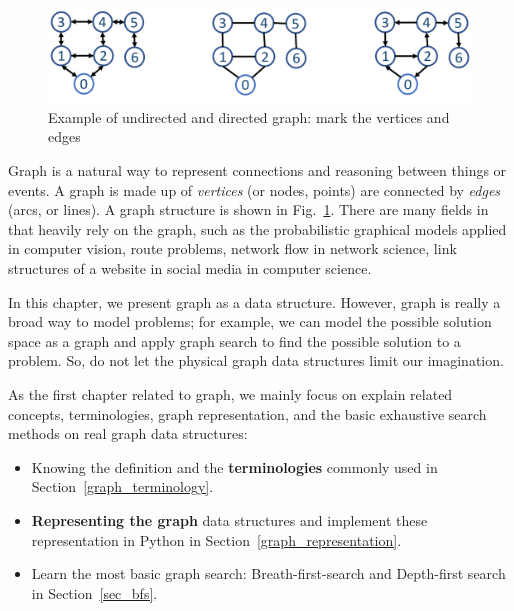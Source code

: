 \documentclass[../main.tex]{subfiles}
\begin{document}
\begin{figure}[!ht]
    \centering
    
        \includegraphics[width=\columnwidth]{fig/example_undirected_directed_graph.png}
    \caption{Example of undirected and directed graph: mark the vertices and edges}
    \label{fig:graph_2}
\end{figure}
Graph is a natural way to represent connections and reasoning between things or events. A graph is made up of \textit{vertices} (or nodes, points) are connected by \textit{edges} (arcs, or lines). A graph structure is shown in Fig.~\ref{fig:graph_2}.  There are many fields in that heavily rely on the graph, such as the probabilistic graphical models applied in computer vision, route problems, network flow in network science, link structures of a website in social media in computer science. 

In this chapter, we present graph as a data structure. However, graph is really a broad way to model problems; for example, we can model the possible solution space as a graph and apply graph search to find the possible solution to a problem.  So, do not let the physical graph data structures limit our imagination. 



As the first chapter related to graph, we mainly focus on explain related concepts, terminologies, graph representation, and the basic exhaustive search methods on real graph data structures:
\begin{itemize}
    \item Knowing the definition and the \textbf{terminologies} commonly used in Section~\ref{graph_terminology}. 
    \item \textbf{Representing the graph} data structures and implement these representation in Python in Section~\ref{graph_representation}.
    \item Learn the most basic graph search: Breath-first-search and Depth-first search in Section~\ref{sec_bfs}. 
\end{itemize}
\end{document}
